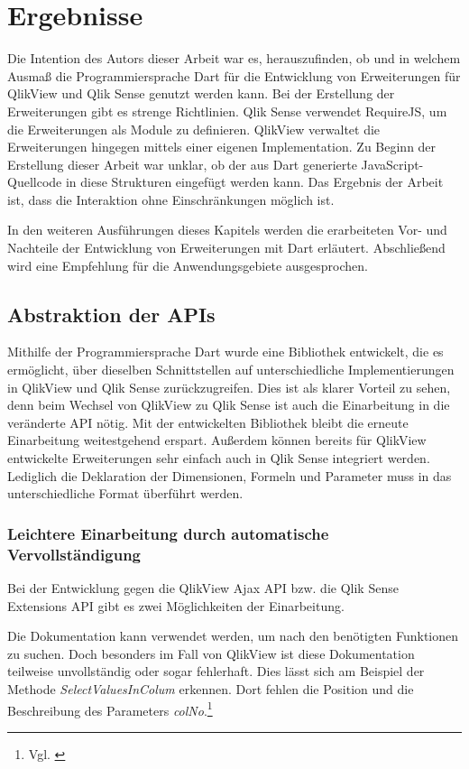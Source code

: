\section{Ergebnisse}
\label{lab:Ergebnisse} 

Die Intention des Autors dieser Arbeit war es, herauszufinden, ob und in welchem Ausmaß die Programmiersprache Dart für die Entwicklung von Erweiterungen für QlikView und Qlik Sense genutzt werden kann. Bei der Erstellung der Erweiterungen gibt es strenge Richtlinien. Qlik Sense verwendet RequireJS, um die Erweiterungen als Module zu definieren. QlikView verwaltet die Erweiterungen hingegen mittels einer eigenen Implementation. Zu Beginn der Erstellung dieser Arbeit war unklar, ob der aus Dart generierte JavaScript-Quellcode in diese Strukturen eingefügt werden kann. Das Ergebnis der Arbeit ist, dass die Interaktion ohne Einschränkungen möglich ist.

In den weiteren Ausführungen dieses Kapitels werden die erarbeiteten Vor- und Nachteile der Entwicklung von Erweiterungen mit Dart erläutert. Abschließend wird eine Empfehlung für die Anwendungsgebiete ausgesprochen.


\subsection{Abstraktion der APIs}


Mithilfe der Programmiersprache Dart wurde eine Bibliothek entwickelt, die es ermöglicht, über dieselben Schnittstellen auf unterschiedliche Implementierungen in QlikView und Qlik Sense zurückzugreifen. Dies ist als klarer Vorteil zu sehen, denn beim Wechsel von QlikView zu Qlik Sense ist auch die Einarbeitung in die veränderte API nötig. Mit der entwickelten Bibliothek bleibt die erneute Einarbeitung weitestgehend erspart. Außerdem können bereits für QlikView entwickelte Erweiterungen sehr einfach auch in Qlik Sense integriert werden. Lediglich die Deklaration der Dimensionen, Formeln und Parameter muss in das unterschiedliche Format überführt werden.

\subsubsection{Leichtere Einarbeitung durch automatische Vervollständigung}


Bei der Entwicklung gegen die QlikView Ajax API bzw. die Qlik Sense Extensions API gibt es zwei Möglich\-keiten der Einarbeitung.

Die Dokumentation kann verwendet werden, um nach den benötigten Funktionen zu suchen. Doch besonders im Fall von QlikView ist diese Dokumentation teilweise unvollständig oder sogar fehlerhaft. Dies lässt sich am Beispiel der Methode \textit{SelectValuesInColum} erkennen. Dort fehlen die Position und die Beschreibung des Parameters \textit{colNo}.\footnote{Vgl. \cite{JsDocReferenceQvDocumentObjectDataSelectValuesInColumn}}

